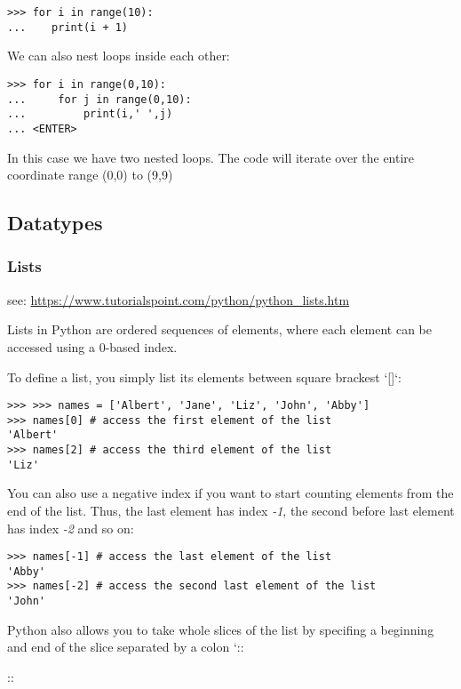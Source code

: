 \begin{verbatim}
>>> for i in range(10):
...    print(i + 1)
\end{verbatim}

We can also nest loops inside each other:

\begin{verbatim}
>>> for i in range(0,10):
...     for j in range(0,10):
...         print(i,' ',j)
... <ENTER>
\end{verbatim}

In this case we have two nested loops. The code will iterate over the
entire coordinate range (0,0) to (9,9)

\subsection{Datatypes}\label{datatypes}

\subsubsection{Lists}\label{lists}

see: \url{https://www.tutorialspoint.com/python/python_lists.htm}

Lists in Python are ordered sequences of elements, where each element
can be accessed using a 0-based index.

To define a list, you simply list its elements between square brackest
`{[}{]}`:

\begin{verbatim}
>>> >>> names = ['Albert', 'Jane', 'Liz', 'John', 'Abby']
>>> names[0] # access the first element of the list
'Albert'
>>> names[2] # access the third element of the list
'Liz'
\end{verbatim}

You can also use a negative index if you want to start counting elements
from the end of the list. Thus, the last element has index \emph{-1},
the second before last element has index \emph{-2} and so on:

\begin{verbatim}
>>> names[-1] # access the last element of the list
'Abby'
>>> names[-2] # access the second last element of the list
'John'
\end{verbatim}

Python also allows you to take whole slices of the list by specifing a
beginning and end of the slice separated by a colon `::

::

